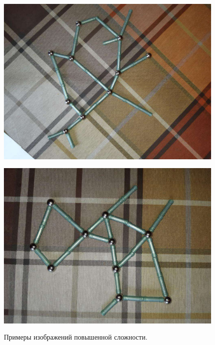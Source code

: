 \documentclass[10pt]{article}
\begin{document}
	\begin{figure}[h]
		\begin{minipage}[h]{0.45\linewidth}
			\begin{center}
				{\includegraphics[width=1.0\linewidth]{data/9.pdf}}
			\end{center}
		\end{minipage}
		\hfill
		\begin{minipage}[h]{0.45\linewidth}
			\begin{center}
				{\includegraphics[width=1.0\linewidth]{data/16.pdf}}
			\end{center}
		\end{minipage}
		\caption{Примеры изображений повышенной сложности.}
		\label{ris:image3}
	\end{figure}
	
\end{document}

